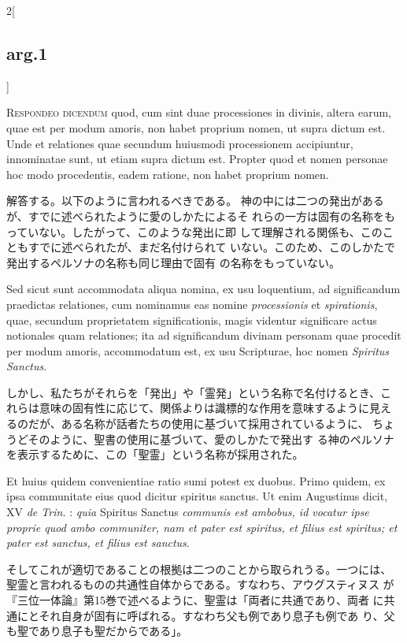 \documentclass[paper=a4paper,fontsize=10pt,jafontsize=9pt,titlepage]{jlreq}
\begin{document}
\begin{paracol}{2}[\subsection{arg.1}]

{\scshape Respondeo dicendum} quod, cum sint duae processiones in divinis, altera
earum, quae est per modum amoris, non habet proprium nomen, ut supra
dictum est. Unde et relationes quae secundum huiusmodi processionem
accipiuntur, innominatae sunt, ut etiam supra dictum est. 
Propter quod
et nomen personae hoc modo procedentis, eadem ratione, non habet
proprium nomen.

\switchcolumn

解答する。以下のように言われるべきである。
神の中には二つの発出があるが、すでに述べられたように愛のしかたによるそ
 れらの一方は固有の名称をもっていない。したがって、このような発出に即
 して理解される関係も、このこともすでに述べられたが、まだ名付けられて
 いない。このため、このしかたで発出するペルソナの名称も同じ理由で固有
 の名称をもっていない。

\switchcolumn*

Sed sicut sunt accommodata aliqua nomina, ex usu
loquentium, ad significandum praedictas relationes, cum nominamus eas
nomine {\itshape processionis} et {\itshape spirationis}, quae, secundum proprietatem
significationis, magis videntur significare actus notionales quam
relationes; ita ad significandum divinam personam quae procedit per
modum amoris, accommodatum est, ex usu Scripturae, hoc nomen {\itshape Spiritus
Sanctus}.

\switchcolumn

しかし、私たちがそれらを「発出」や「霊発」という名称で名付けるとき、こ
 れらは意味の固有性に応じて、関係よりは識標的な作用を意味するように見え
 るのだが、ある名称が話者たちの使用に基づいて採用されているように、
ちょうどそのように、聖書の使用に基づいて、愛のしかたで発出す
 る神のペルソナを表示するために、この「聖霊」という名称が採用された。

\switchcolumn*

Et huius quidem convenientiae ratio sumi potest ex
duobus. Primo quidem, ex ipsa communitate eius quod dicitur spiritus
sanctus. Ut enim Augustinus dicit, XV {\itshape de Trin.} : {\itshape quia}
Spiritus Sanctus {\itshape communis est ambobus, id vocatur ipse proprie quod ambo communiter,
nam et pater est spiritus, et filius est spiritus; et pater est
sanctus, et filius est sanctus}.

\switchcolumn

そしてこれが適切であることの根拠は二つのことから取られうる。一つには、
 聖霊と言われるものの共通性自体からである。すなわち、アウグスティヌス
 が『三位一体論』第15巻で述べるように、聖霊は「両者に共通であり、両者
 に共通にとそれ自身が固有に呼ばれる。すなわち父も例であり息子も例であ
 り、父も聖であり息子も聖だからである」。


\end{paracol}
\end{document}

